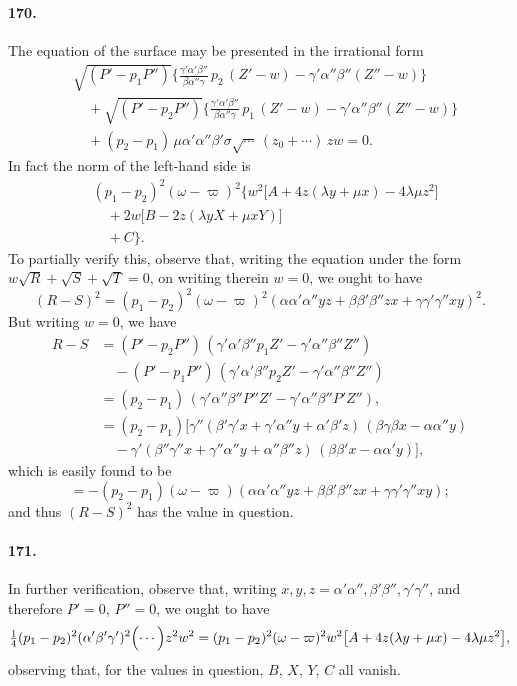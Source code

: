 \documentclass[11pt,a4paper]{article}
\begin{document}
\paragraph{170.}
The equation of the surface may be presented in the irrational form
\[
\begin{aligned}
&\sqrt{(P' - p_1 P'')}\bigl\{\tfrac{\gamma'\alpha'\beta''}{\beta\alpha''\gamma}\, p_2\,(Z' - w) - \gamma'\alpha''\beta''(Z'' - w)\bigr\} \\
&\quad + \sqrt{(P' - p_2 P'')}\bigl\{\tfrac{\gamma'\alpha'\beta''}{\beta\alpha''\gamma}\, p_1\,(Z' - w) - \gamma'\alpha''\beta''(Z'' - w)\bigr\} \\
&\quad + (p_2 - p_1)\,\mu\alpha'\alpha''\beta'\sigma\sqrt{\dotsb}\,(z_0 +\dotsb)\,zw = 0.
\end{aligned}
\]
In fact the norm of the left-hand side is
\[
\begin{aligned}
& (p_1 - p_2)^2 (\omega - \varpi)^2\bigl\{w^2\bigl[A + 4z(\lambda y + \mu x) - 4\lambda\mu z^2\bigr] \\
&\quad + 2 w \bigl[B - 2 z(\lambda y X + \mu x Y)\bigr] \\
&\quad + C \bigr\}.
\end{aligned}
\]
To partially verify this, observe that, writing the equation under the
form $w\sqrt{R} + \sqrt{S} + \sqrt{T} = 0$, on writing therein $w = 0$,
we ought to have
\[
(R - S)^2 = (p_1 - p_2)^2 (\omega - \varpi)^2 (\alpha\alpha'\alpha'' yz
+ \beta\beta'\beta'' zx + \gamma\gamma'\gamma'' xy)^2.
\]
But writing $w = 0$, we have
\[
\begin{aligned}
R - S &= (P' - p_2 P'')\,(\gamma'\alpha'\beta'' p_1 Z' - \gamma'\alpha''\beta'' Z'')
\\
&\quad - (P' - p_1 P'')\,(\gamma'\alpha'\beta'' p_2 Z' - \gamma'\alpha''\beta'' Z'') \\
&= (p_2 - p_1)\,(\gamma'\alpha''\beta'' P'' Z' - \gamma'\alpha''\beta'' P' Z''), \\
&= (p_2 - p_1)\bigl[\gamma''(\beta'\gamma' x + \gamma'\alpha'' y + \alpha'\beta' z)\,(\beta\gamma\beta x - \alpha\alpha'' y) \\
&\quad - \gamma'(\beta''\gamma'' x + \gamma''\alpha'' y + \alpha''\beta'' z)\,(\beta\beta' x - \alpha\alpha' y)\bigr],
\end{aligned}
\]
which is easily found to be
\[
= -(p_2 - p_1)(\omega - \varpi)(\alpha\alpha'\alpha'' yz
+ \beta\beta'\beta'' zx + \gamma\gamma'\gamma'' xy);
\]
and thus $(R - S)^2$ has the value in question.

\paragraph{171.}
In further verification, observe that, writing $x, y, z = \alpha'\alpha'',
\beta'\beta'', \gamma'\gamma''$, and therefore $P' = 0$, $P'' = 0$, we
ought to have
\[
\tfrac{1}{4}(p_1 - p_2)^2 (\alpha'\beta'\gamma')^2 \Bigl(\dotsb\Bigr) z^2 w^2
= (p_1 - p_2)^2 (\omega - \varpi)^2 w^2 \bigl[A + 4z(\lambda y + \mu x) - 4\lambda\mu z^2\bigr],
\]
observing that, for the values in question, $B$, $X$, $Y$, $C$ all vanish.
\end{document}
